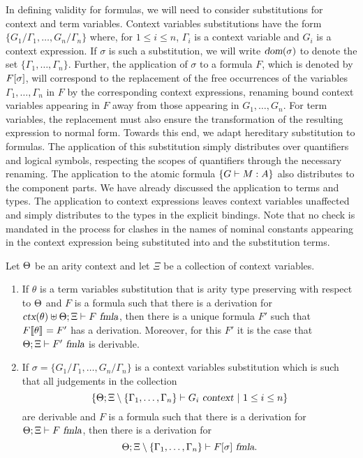 In defining validity for formulas, we will need to consider
substitutions for context and term variables.
%
Context variables substitutions have the form
$\{G_1/\Gamma_1,\ldots,G_n/\Gamma_n\}$ where, for $1 \leq i \leq n$,
$\Gamma_i$ is a context variable and $G_i$ is a context expression. 
%
If $\sigma$ is such a substitution, we will write $\mbox{\sl dom}(\sigma)$ to
denote the set $\{\Gamma_1,\ldots,\Gamma_n\}$.
%
Further, the application of $\sigma$ to a formula
$F$, which is denoted by $F[\sigma]$, will correspond to the 
replacement of the free occurrences of the variables
$\Gamma_1,\ldots,\Gamma_n$ in $F$ by the corresponding context
expressions, renaming bound context variables appearing in $F$ away
from those appearing in $G_1,\ldots,G_n$.
%
For term variables, the replacement must also ensure the
transformation of the resulting expression to normal form.
%
Towards this end, we adapt hereditary substitution to formulas.
%
The application of this substitution simply distributes over
quantifiers and logical symbols, respecting the scopes of quantifiers
through the necessary renaming.
%
The application to the atomic formula $\left\{G \vdash M:A\right\}$ also distributes
to the component parts.
%
We have already discussed the application to terms and types.
%
The application to context expressions leaves context variables
unaffected and simply distributes to the types in the explicit
bindings.
%
Note that no check is mandated in the process for clashes in the names
of nominal constants appearing in the context expression being
substituted into and the substitution terms. 
%


\begin{theorem}\label{th:subst-formula}
Let $\Theta$ be an arity context and let $\Xi$ be a collection of
context variables.
\begin{enumerate}
\item If $\theta$ is a term variables substitution that is arity type preserving with
respect to $\Theta$ and $F$ is a formula such that there is a
derivation for $\mbox{\sl ctx}(\theta) \uplus \Theta;\Xi \vdash F\ \mbox{\sl fmla}$,
then there is a unique formula $F'$ such that
$F\llbracket {\theta} \rrbracket_{} = F'$ has a derivation.
%
Moreover, for this $F'$ it is the case that
$\Theta;\Xi \vdash F'\ \mbox{\sl fmla}$ is derivable.  

\item If $\sigma=\{G_1/\Gamma_1,\ldots,G_n/\Gamma_n\}$ is a context variables
substitution which is such that all judgements in the collection
\[\left\{\wfctx{\STLCGamma}
             {\Xi\setminus\{\Gamma_1,\ldots,\Gamma_n\}}{G_i}\ |\ 
                    1\leq i\leq n\right\}\]
are derivable and $F$ is a formula such that there is a derivation for
$\Theta;\Xi \vdash F\ \mbox{\sl fmla}$, then there is a derivation for
\[\Theta;\Xi\setminus\{\Gamma_1,\ldots,\Gamma_n\} \vdash F[\sigma]\ \mbox{\sl fmla}.\]
\end{enumerate}
\end{theorem}

